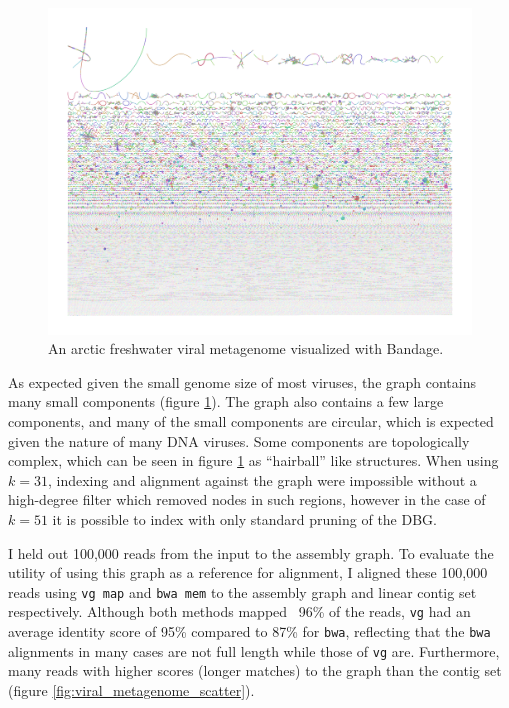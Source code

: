 \begin{figure}[htbp!]
  \centering
  \includegraphics[width=1.0\textwidth]{Chapter3/Figs/svalbard_metagenome_minia_k51_m3_contigs_gfa.png}
  \caption[An arctic freshwater viral metagenome]{
    An arctic freshwater viral metagenome visualized with Bandage.
  }
  \label{fig:viral_metagenome_bandage}
\end{figure}

As expected given the small genome size of most viruses, the graph contains many small components (figure \ref{fig:viral_metagenome_bandage}).
The graph also contains a few large components, and many of the small components are circular, which is expected given the nature of many DNA viruses.
Some components are topologically complex, which can be seen in figure \ref{fig:viral_metagenome_bandage} as ``hairball'' like structures.
When using $k=31$, indexing and alignment against the graph were impossible without a high-degree filter which removed nodes in such regions, however in the case of $k=51$ it is possible to index with only standard pruning of the DBG.

I held out 100,000 reads from the input to the assembly graph.
To evaluate the utility of using this graph as a reference for alignment, I aligned these 100,000 reads using {\tt vg map} and {\tt bwa mem} to the assembly graph and linear contig set respectively.
Although both methods mapped ~96\% of the reads, {\tt vg} had an average identity score of 95\% compared to 87\% for {\tt bwa}, reflecting that the {\tt bwa} alignments in many cases are not full length while those of {\tt vg} are. Furthermore, many reads with higher scores (longer matches) to the graph than the contig set (figure \ref{fig:viral_metagenome_scatter}).

